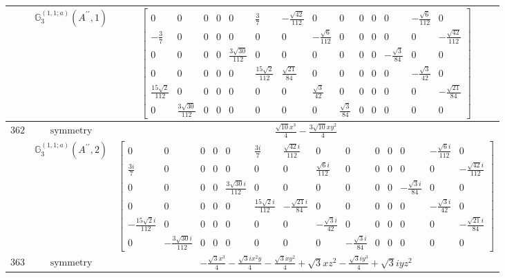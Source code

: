 \documentclass[fleqn,8pt,landscape]{jsarticle}
\begin{document}
\begin{longtable}{ccc}
$  $ & $ \mathbb{G}_{3}^{(1,1;a)}(A^{\prime\prime},1) $ & $ \begin{bmatrix} 0 & 0 & 0 & 0 & 0 & \frac{3}{7} & - \frac{\sqrt{42}}{112} & 0 & 0 & 0 & 0 & 0 & - \frac{\sqrt{6}}{112} & 0 \\ - \frac{3}{7} & 0 & 0 & 0 & 0 & 0 & 0 & - \frac{\sqrt{6}}{112} & 0 & 0 & 0 & 0 & 0 & - \frac{\sqrt{42}}{112} \\ 0 & 0 & 0 & 0 & \frac{3 \sqrt{30}}{112} & 0 & 0 & 0 & 0 & 0 & 0 & - \frac{\sqrt{3}}{84} & 0 & 0 \\ 0 & 0 & 0 & 0 & 0 & \frac{15 \sqrt{2}}{112} & \frac{\sqrt{21}}{84} & 0 & 0 & 0 & 0 & 0 & - \frac{\sqrt{3}}{42} & 0 \\ \frac{15 \sqrt{2}}{112} & 0 & 0 & 0 & 0 & 0 & 0 & \frac{\sqrt{3}}{42} & 0 & 0 & 0 & 0 & 0 & - \frac{\sqrt{21}}{84} \\ 0 & \frac{3 \sqrt{30}}{112} & 0 & 0 & 0 & 0 & 0 & 0 & \frac{\sqrt{3}}{84} & 0 & 0 & 0 & 0 & 0 \end{bmatrix} $ \\ \hline
$ 362 $ & $ \text{symmetry} $ & $ \frac{\sqrt{10} x^{3}}{4} - \frac{3 \sqrt{10} x y^{2}}{4} $ \\
$  $ & $ \mathbb{G}_{3}^{(1,1;a)}(A^{\prime\prime},2) $ & $ \begin{bmatrix} 0 & 0 & 0 & 0 & 0 & \frac{3 i}{7} & \frac{\sqrt{42} i}{112} & 0 & 0 & 0 & 0 & 0 & - \frac{\sqrt{6} i}{112} & 0 \\ \frac{3 i}{7} & 0 & 0 & 0 & 0 & 0 & 0 & \frac{\sqrt{6} i}{112} & 0 & 0 & 0 & 0 & 0 & - \frac{\sqrt{42} i}{112} \\ 0 & 0 & 0 & 0 & \frac{3 \sqrt{30} i}{112} & 0 & 0 & 0 & 0 & 0 & 0 & - \frac{\sqrt{3} i}{84} & 0 & 0 \\ 0 & 0 & 0 & 0 & 0 & \frac{15 \sqrt{2} i}{112} & - \frac{\sqrt{21} i}{84} & 0 & 0 & 0 & 0 & 0 & - \frac{\sqrt{3} i}{42} & 0 \\ - \frac{15 \sqrt{2} i}{112} & 0 & 0 & 0 & 0 & 0 & 0 & - \frac{\sqrt{3} i}{42} & 0 & 0 & 0 & 0 & 0 & - \frac{\sqrt{21} i}{84} \\ 0 & - \frac{3 \sqrt{30} i}{112} & 0 & 0 & 0 & 0 & 0 & 0 & - \frac{\sqrt{3} i}{84} & 0 & 0 & 0 & 0 & 0 \end{bmatrix} $ \\ \hline
$ 363 $ & $ \text{symmetry} $ & $ - \frac{\sqrt{3} x^{3}}{4} - \frac{\sqrt{3} i x^{2} y}{4} - \frac{\sqrt{3} x y^{2}}{4} + \sqrt{3} x z^{2} - \frac{\sqrt{3} i y^{3}}{4} + \sqrt{3} i y z^{2} $ \\

\end{longtable}
\end{document}
